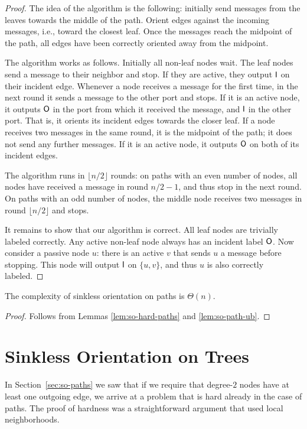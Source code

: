 \begin{proof}
	The idea of the algorithm is the following: initially send messages from the leaves towards the middle of the path. Orient edges against the incoming messages, i.e., toward the closest leaf. Once the messages reach the midpoint of the path, all edges have been correctly oriented away from the midpoint.

	The algorithm works as follows. Initially all non-leaf nodes wait. The leaf nodes send a message to their neighbor and stop. If they are active, they output $\mathsf{I}$ on their incident edge. 
	Whenever a node receives a message for the first time, in the next round it sends a message to the other port and stops. If it is an active node, it outputs $\mathsf{O}$ in the port from which it received the message, and $\mathsf{I}$ in the other port. That is, it orients its incident edges towards the closer leaf. If a node receives two messages in the same round, it is the midpoint of the path; it does not send any further messages. If it is an active node, it outputs $\mathsf{O}$ on both of its incident edges.

	The algorithm runs in $\lfloor n/2 \rfloor$ rounds: on paths with an even number of nodes, all nodes have received a message in round $n/2 - 1$, and thus stop in the next round. On paths with an odd number of nodes, the middle node receives two messages in round $\lfloor n/2 \rfloor$ and stops.

	It remains to show that our algorithm is correct. All leaf nodes are trivially labeled correctly. Any active non-leaf node always has an incident label $\mathsf{O}$. Now consider a passive node $u$: there is an active $v$ that sends $u$ a message before stopping. This node will output $\mathsf{I}$ on $\{u,v\}$, and thus $u$ is also correctly labeled.
\end{proof}

\begin{theorem}
	The complexity of sinkless orientation on paths is $\Theta(n)$.
\end{theorem}

\begin{proof}
	Follows from Lemmas \ref{lem:so-hard-paths} and \ref{lem:so-path-ub}.
\end{proof}

\section{Sinkless Orientation on Trees}

In Section~\ref{sec:so-paths} we saw that if we require that degree-$2$ nodes have at least one outgoing edge, we arrive at a problem that is hard already in the case of paths. The proof of hardness was a straightforward argument that used local neighborhoods.

